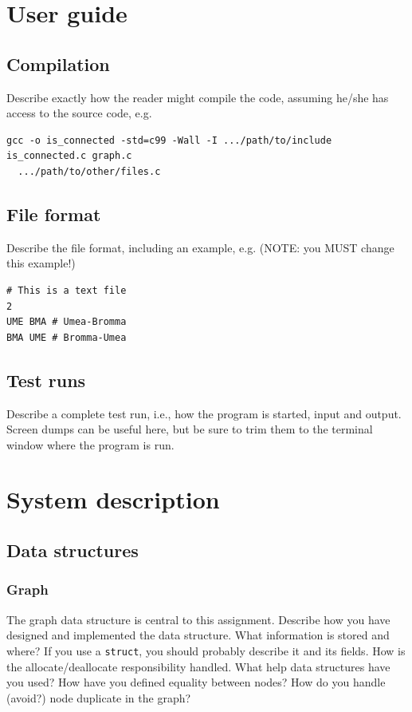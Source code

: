 \documentclass{article}
\begin{document}
\section{User guide}
\label{sec:user_guide}
\subsection{Compilation}
\label{sec:compilation}
Describe exactly how the reader might compile the code, assuming
he/she has access to the source code, e.g.
\label{example:compile}
\begin{verbatim}
gcc -o is_connected -std=c99 -Wall -I .../path/to/include is_connected.c graph.c
  .../path/to/other/files.c
\end{verbatim}
\subsection{File format}
\label{sec:file_format}
Describe the file format, including an example, e.g. (NOTE: you MUST change this example!)
\begin{verbatim}
# This is a text file
2
UME BMA # Umea-Bromma
BMA UME # Bromma-Umea
\end{verbatim}
\subsection{Test runs}
\label{sec:test_run}
Describe a complete test run, i.e., how the program is started, input
and output. Screen dumps can be useful here, but be sure to trim them
to the terminal window where the program is run.
\section{System description}
\label{sec:system_description}
\subsection{Data structures}
\label{sec:org6e002c6}
\subsubsection{Graph}
\label{sec:graph}
The graph data structure is central to this assignment. Describe how
you have designed and implemented the data structure. What information
is stored and where? If you use a \texttt{struct}, you should probably
describe it and its fields. How is the allocate/deallocate
responsibility handled. What help data structures have you used? How
have you defined equality between nodes? How do you handle (avoid?)
node duplicate in the graph?
\end{document}
